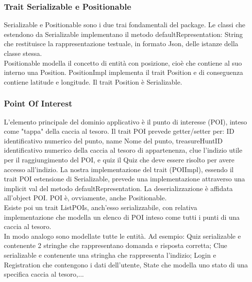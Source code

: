 \documentclass[12pt, italian]{article}
\begin{document}
\subsubsection*{Trait Serializable e Positionable}
Serializable e Positionable sono i due trai fondamentali del package.
Le classi che estendono da Serializable implementano il metodo defaultRepresentation: String che restituisce la rappresentazione testuale, in formato Json, delle istanze della classe stessa.\\
Positionable modella il concetto di entità con posizione, cioè che contiene al suo interno una Position. PositionImpl implementa il trait Position e di conseguenza contiene latitude e longitude. Il trait Position è Serializable.

\subsubsection*{Point Of Interest}
L'elemento principale del dominio applicativo è il punto di interesse (POI), inteso come "tappa" della caccia al tesoro.
Il trait POI prevede getter/setter per: ID identificativo numerico del punto, name Nome del punto, treasureHuntID identificativo numerico della caccia al tesoro di appartenenza, clue l'indizio utile per il raggiungimento del POI, e quiz il Quiz che deve essere risolto per avere accesso all'indizio.
La nostra implementazione del trait (POIImpl), essendo il trait POI estensione di Serializable, prevede una implementazione attraverso una implicit val del metodo defaultRepresentation. La deserializzazione è affidata all'object POI.
POI è, ovviamente, anche Positionable.\\
Esiste poi un trait ListPOIs, anch'esso serializzabile, con relativa implementazione che modella un elenco di POI inteso come tutti i punti di una caccia al tesoro.\\
In modo analogo sono modellate tutte le entità. Ad esempio: Quiz serializable e contenente 2 stringhe che rappresentano domanda e risposta corretta; Clue serializable e contenente una stringha che rappresenta l'indizio; Login e Registration che contengono i dati dell'utente, State che modella uno stato di una specifica caccia al tesoro,...
\end{document}
